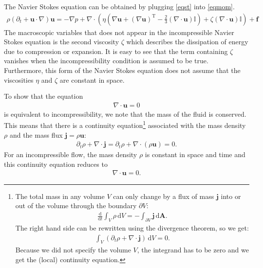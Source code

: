 \documentclass[a4paper,10pt,bibtotoc]{scrartcl}
\begin{document}
\noindent The Navier Stokes equation can be obtained by plugging \autoref{eqst} into \autoref{eqmom}. 
\begin{align}
 \rho\left(\partial_t + \mathbf{u}\cdot \nabla\right)\mathbf{u} = -\nabla p + \nabla\cdot\left(\eta\left(\nabla\mathbf{u}+\left(\nabla\mathbf{u}\right)^\mathrm{T} - \frac{2}{3}\left(\nabla\cdot\mathbf{u}\right)\mathbb{I}\right) + \zeta \left(\nabla\cdot\mathbf{u}\right)\mathbb{I}\right) + \mathbf{f}
\end{align}
The macroscopic variables that does not appear in the incompressible Navier Stokes equation is the second viscosity $\zeta$ which describes the dissipation of energy due to compression or expansion. It is easy to see that the term containing $\zeta$ vanishes when the incompressibility condition is assumed to be true. Furthermore, this form of the Navier Stokes equation does not assume that the viscosities $\eta$ and $\zeta$ are constant in space. 



To show that the equation
\begin{align}
 \nabla\cdot \mathbf{u} = 0
\end{align}
is equivalent to incompressibility, we note that the mass of the fluid is conserved. This means that there is a continuity equation\footnote{The total mass in any volume $V$ can only change by a flux of mass $\mathbf{j}$ into or out of the volume through the boundary $\partial V$:  
\begin{align*}
\frac{\mathrm{d}}{\mathrm{d}t}\int_{V}\rho\,\mathrm{d}V = -\int_{\partial V} \mathbf{j}\,\mathrm{d}\mathbf{A}.
\end{align*}
The right hand side can be rewritten using the divergence theorem, so we get:
\begin{align*}
\int_{V}\left(\partial_t\rho+\nabla\cdot\mathbf{j}\right)\,\mathrm{d}V = 0.
\end{align*}
Because we did not specify the volume $V$, the integrand has to be zero and we get the (local) continuity equation.
} associated with the mass density $\rho$ and the mass flux $\mathbf{j} = \rho\mathbf{u}$:
\begin{align}
 \partial_t\rho + \nabla\cdot \mathbf{j} = \partial_t \rho + \nabla\cdot\left(\rho\mathbf{u}\right)= 0.
\end{align}
For an incompressible flow, the mass density $\rho$ is constant in space and time and this continuity equation reduces to
\begin{align}
 \nabla\cdot\mathbf{u} = 0.
\end{align}
\end{document}
